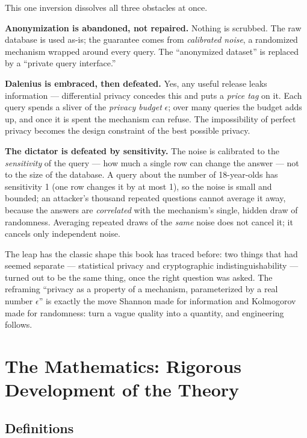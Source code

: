 This one inversion dissolves all three obstacles at once. 

\textbf{Anonymization is abandoned, not repaired.} Nothing is scrubbed. The raw database is used as-is; the guarantee comes from \emph{calibrated noise}, a randomized mechanism wrapped around every query. The ``anonymized dataset'' is replaced by a ``private query interface.''

\textbf{Dalenius is embraced, then defeated.} Yes, any useful release leaks information --- differential privacy concedes this and puts a \emph{price tag} on it. Each query spends a sliver of the \emph{privacy budget} $\epsilon$; over many queries the budget adds up, and once it is spent the mechanism can refuse. The impossibility of perfect privacy becomes the design constraint of the best possible privacy.

\textbf{The dictator is defeated by sensitivity.} The noise is calibrated to the \emph{sensitivity} of the query --- how much a single row can change the answer --- not to the size of the database. A query about the number of 18-year-olds has sensitivity 1 (one row changes it by at most 1), so the noise is small and bounded; an attacker's thousand repeated questions cannot average it away, because the answers are \emph{correlated} with the mechanism's single, hidden draw of randomness. Averaging repeated draws of the \emph{same} noise does not cancel it; it cancels only independent noise.

The leap has the classic shape this book has traced before: two things that had seemed separate --- statistical privacy and cryptographic indistinguishability --- turned out to be the same thing, once the right question was asked.  The reframing ``privacy as a property of a mechanism, parameterized by a real number $\epsilon$'' is exactly the move Shannon made for information and Kolmogorov made for randomness: turn a vague quality into a quantity, and engineering follows.

\section{The Mathematics: Rigorous Development of the Theory}
\label{sec:dp:math}

\subsection{Definitions}
\label{sec:dp:definitions}

